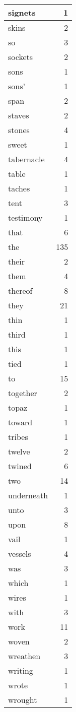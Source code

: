 \begin{center}
\begin{longtable}{l|r}
signets & 1 \\ \hline
skins & 2 \\ \hline
so & 3 \\ \hline
sockets & 2 \\ \hline
sons & 1 \\ \hline
sons' & 1 \\ \hline
span & 2 \\ \hline
staves & 2 \\ \hline
stones & 4 \\ \hline
sweet & 1 \\ \hline
tabernacle & 4 \\ \hline
table & 1 \\ \hline
taches & 1 \\ \hline
tent & 3 \\ \hline
testimony & 1 \\ \hline
that & 6 \\ \hline
the & 135 \\ \hline
their & 2 \\ \hline
them & 4 \\ \hline
thereof & 8 \\ \hline
they & 21 \\ \hline
thin & 1 \\ \hline
third & 1 \\ \hline
this & 1 \\ \hline
tied & 1 \\ \hline
to & 15 \\ \hline
together & 2 \\ \hline
topaz & 1 \\ \hline
toward & 1 \\ \hline
tribes & 1 \\ \hline
twelve & 2 \\ \hline
twined & 6 \\ \hline
two & 14 \\ \hline
underneath & 1 \\ \hline
unto & 3 \\ \hline
upon & 8 \\ \hline
vail & 1 \\ \hline
vessels & 4 \\ \hline
was & 3 \\ \hline
which & 1 \\ \hline
wires & 1 \\ \hline
with & 3 \\ \hline
work & 11 \\ \hline
woven & 2 \\ \hline
wreathen & 3 \\ \hline
writing & 1 \\ \hline
wrote & 1 \\ \hline
wrought & 1 \\ \hline
\end{longtable}
\end{center}



